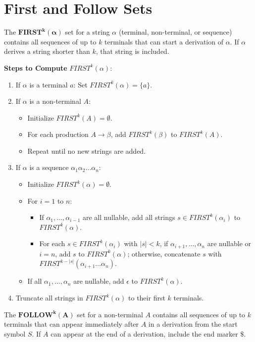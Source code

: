 \section{First and Follow Sets}

The $\mathbf{FIRST^k(\alpha)}$ set for a string $\alpha$ (terminal, non-terminal, or sequence) contains all sequences of up to $k$ terminals that can start a derivation of $\alpha$. If $\alpha$ derives a string shorter than $k$, that string is included.

\textbf{Steps to Compute} $FIRST^k(\alpha)$:
\begin{enumerate}
\item If $\alpha$ is a terminal $a$: Set $FIRST^k(\alpha) = \{a\}$.
\item If $\alpha$ is a non-terminal $A$:
   \begin{itemize}
   \item Initialize $FIRST^k(A) = \emptyset$.
   \item For each production $A \to \beta$, add $FIRST^k(\beta)$ to $FIRST^k(A)$.
   \item Repeat until no new strings are added.
   \end{itemize}
\item If $\alpha$ is a sequence $\alpha_1 \alpha_2 \dots \alpha_n$:
   \begin{itemize}
   \item Initialize $FIRST^k(\alpha) = \emptyset$.
   \item For $i = 1$ to $n$:
     \begin{itemize}
     \item If $\alpha_1, \dots, \alpha_{i-1}$ are all nullable, add all strings $s \in FIRST^k(\alpha_i)$ to $FIRST^k(\alpha)$.
     \item For each $s \in FIRST^k(\alpha_i)$ with $|s| < k$, if $\alpha_{i+1}, \dots, \alpha_n$ are nullable or $i = n$, add $s$ to $FIRST^k(\alpha)$; otherwise, concatenate $s$ with $FIRST^{k-|s|}(\alpha_{i+1} \dots \alpha_n)$.
     \end{itemize}
   \item If all $\alpha_1, \dots, \alpha_n$ are nullable, add $\epsilon$ to $FIRST^k(\alpha)$.
   \end{itemize}
\item Truncate all strings in $FIRST^k(\alpha)$ to their first $k$ terminals.
\end{enumerate}

The $\mathbf{FOLLOW^k(A)}$ set for a non-terminal $A$ contains all sequences of up to $k$ terminals that can appear immediately after $A$ in a derivation from the start symbol $S$. If $A$ can appear at the end of a derivation, include the end marker $\$$.

